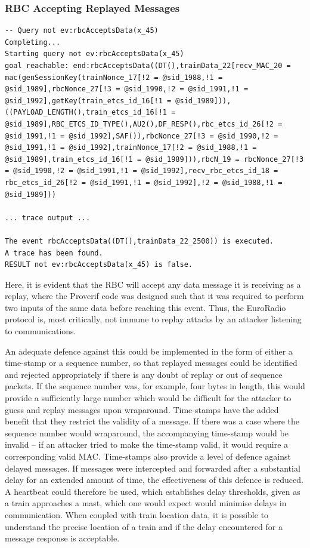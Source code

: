 \documentclass[twoside,11pt,a4paper]{article}
\begin{document}
\subsubsection{RBC Accepting Replayed Messages}
\begin{lstlisting}
-- Query not ev:rbcAcceptsData(x_45)
Completing...
Starting query not ev:rbcAcceptsData(x_45)
goal reachable: end:rbcAcceptsData((DT(),trainData_22[recv_MAC_20 = mac(genSessionKey(trainNonce_17[!2 = @sid_1988,!1 = @sid_1989],rbcNonce_27[!3 = @sid_1990,!2 = @sid_1991,!1 = @sid_1992],getKey(train_etcs_id_16[!1 = @sid_1989])),((PAYLOAD_LENGTH(),train_etcs_id_16[!1 = @sid_1989],RBC_ETCS_ID_TYPE(),AU2(),DF_RESP(),rbc_etcs_id_26[!2 = @sid_1991,!1 = @sid_1992],SAF()),rbcNonce_27[!3 = @sid_1990,!2 = @sid_1991,!1 = @sid_1992],trainNonce_17[!2 = @sid_1988,!1 = @sid_1989],train_etcs_id_16[!1 = @sid_1989])),rbcN_19 = rbcNonce_27[!3 = @sid_1990,!2 = @sid_1991,!1 = @sid_1992],recv_rbc_etcs_id_18 = rbc_etcs_id_26[!2 = @sid_1991,!1 = @sid_1992],!2 = @sid_1988,!1 = @sid_1989]))

... trace output ...

The event rbcAcceptsData((DT(),trainData_22_2500)) is executed.
A trace has been found.
RESULT not ev:rbcAcceptsData(x_45) is false.
\end{lstlisting}
Here, it is evident that the RBC will accept any data message it is receiving as a replay, where the Proverif code was designed such that it was required to perform two inputs of the same data before reaching this event. Thus, the EuroRadio protocol is, most critically, not immune to replay attacks by an attacker listening to communications.

An adequate defence against this could be implemented in the form of either a time-stamp or a sequence number, so that replayed messages could be identified and rejected appropriately if there is any doubt of replay or out of sequence packets. If the sequence number was, for example, four bytes in length, this would provide a sufficiently large number which would be difficult for the attacker to guess and replay messages upon wraparound.  Time-stamps have the added benefit that they restrict the validity of a message. If there was a case where the sequence number would wraparound, the accompanying time-stamp would be invalid -- if an attacker tried to make the time-stamp valid, it would require a corresponding valid MAC. Time-stamps also provide a level of defence against delayed messages. If messages were intercepted and forwarded after a substantial delay for an extended amount of time, the effectiveness of this defence is reduced. A heartbeat could therefore be used, which establishes delay thresholds, given as a train approaches a mast, which one would expect would minimise delays in communication. When coupled with train location data, it is possible to understand the precise location of a train and if the delay encountered for a message response is acceptable.
\end{document}
